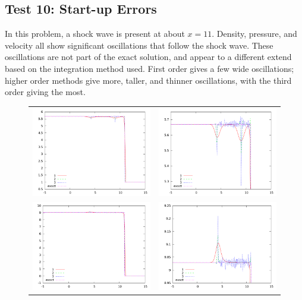 \documentclass[10pt]{article}
\begin{document}
\clearpage

\subsection{Test 10: Start-up Errors}

In this problem, a shock wave is present at about $x=11$. Density, pressure, and velocity all show significant oscillations that follow the shock wave. These oscillations are not part of the exact solution, and appear to a different extend based on the integration method used. First order gives a few wide oscillations; higher order methods give more, taller, and thinner oscillations, with the third order giving the most. 
\begin{figure}[h]
  \begin{center}
	\begin{tabular}{cc}
      \includegraphics[width=.4\textwidth]{den_T10.png} &
	  \includegraphics[width=.4\textwidth]{den10zoom.png} \\
	  \includegraphics[width=.4\textwidth]{vel_T10.png} &	
	  \includegraphics[width=.4\textwidth]{vel10zoom.png} \\

\end{tabular}
\end{center}
\end{figure}
\end{document}
